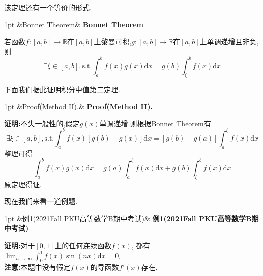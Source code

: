 \documentclass{ctexart}
\newcommand{\di}{\mathrm{d}}
\newcommand{\R}{\mathbb{R}}
\newcommand{\st}{,\text{s.t.}}
\newcommand{\dx}{\di x}
\newenvironment{solution}[1][]{%
\def\FrameCommand{%
\hspace{1pt}%
{\color{solutionline}\vrule width 2pt}%
{\color{solutionshade}\vrule width 4pt}%
\colorbox{solutionshade}%
}%
\MakeFramed{\advance\hsize-\width\FrameRestore}%
\noindent\hspace{-4.55pt}%
\begin{adjustwidth}{}{1pt}%
\setlength{\parindent}{0pt}%
\vspace{3pt}%
\ifx&#1&\else %
    \textbf{#1}\par\vspace{1pt}%
\fi
}
{%
\vspace{2pt}%
\end{adjustwidth}\endMakeFramed%
}
\newenvironment{problem}[1][]{%
\def\FrameCommand{%
\hspace{1pt}%
{\color{problemline}\vrule width 2pt}%
{\color{problemshade}\vrule width 4pt}%
\colorbox{problemshade}%
}%
\MakeFramed{\advance\hsize-\width\FrameRestore}%
\noindent\hspace{-4.55pt}%
\begin{adjustwidth}{}{1pt}%
\setlength{\parindent}{0pt}%
\vspace{3pt}%
\ifx&#1&\else %
    \textbf{#1}\par\vspace{1pt}%
\fi
}
{%
\vspace{2pt}%
\end{adjustwidth}\endMakeFramed%
}
\newenvironment{theorem}[1][]{%
\def\FrameCommand{%
\hspace{1pt}%
{\color{theoremline}\vrule width 2pt}%
{\color{theoremshade}\vrule width 4pt}%
\colorbox{theoremshade}%
}%
\MakeFramed{\advance\hsize-\width\FrameRestore}%
\noindent\hspace{-4.55pt}%
\begin{adjustwidth}{}{1pt}%
\setlength{\parindent}{0pt}%
\vspace{3pt}%
\ifx&#1&\else %
    \textbf{#1}\par\vspace{1pt}%
\fi
}
{%
\vspace{2pt}%
\end{adjustwidth}\endMakeFramed%
}
\begin{document}
该定理还有一个等价的形式.
\begin{theorem}[Bonnet Theorem]
    若函数$f:[a,b]\to\R$在$[a,b]$上黎曼可积,$g:[a,b]\to\R$在$[a,b]$上单调递增且非负,则
    $$\exists\xi\in[a,b]\st\int_{a}^{b}{f(x)g(x)\dx}=g(b)\int_{\xi}^{b}{f(x)\dx}$$
\end{theorem}\noindent
下面我们据此证明积分中值第二定理.
\begin{solution}[Proof(Method II).]
    \textbf{证明:}不失一般性的,假定$g(x)$单调递增.则根据Bonnet Theorem有
    $$\exists\xi\in[a,b]\st\int_{a}^{b}{f(x)\left[g(b)-g(x)\right]\dx}=\left[g(b)-g(a)\right]\int_{a}^{\xi}{f(x)\dx}$$
    整理可得$$\int_{a}^{b}{f(x)g(x)\dx}=g(a)\int_{a}^{\xi}{f(x)\dx}+g(b)\int_{\xi}^{b}{f(x)\dx}$$
    原定理得证.
\end{solution}\noindent
现在我们来看一道例题.
\begin{problem}[例1(2021Fall PKU高等数学B期中考试)]
    \textbf{证明:}对于$[0,1]$上的任何连续函数$f(x)$,
    都有$\displaystyle\lim_{n\to\infty}{\int_{0}^{1}{f(x)\sin(nx)\dx}}=0$.\\
    \textbf{注意:}本题中没有假定$f(x)$的导函数$f'(x)$存在.
\end{problem}
\end{document}
